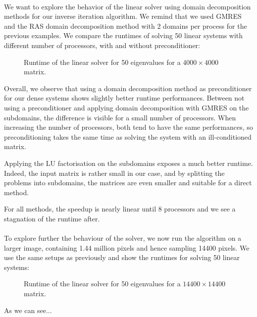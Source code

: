 \paragraph{}
We want to explore the behavior of the linear solver using domain decomposition methods for our inverse iteration algorithm.
We remind that we used GMRES and the RAS domain decomposition method with 2 domains per process for the previous examples.
We compare the runtimes of solving 50 linear systems with different number of processors, with and without preconditioner:

\begin{figure}[H]
 \centering
 
 \caption{Runtime of the linear solver for 50 eigenvalues for a \(4000 \times 4000\) matrix.}
\end{figure}

Overall, we observe that using a domain decomposition method as preconditioner for our dense systems shows slightly better runtime performances.
Between not using a preconditioner and applying domain decomposition with GMRES on the subdomains, the difference is visible for a small number of processors.
When increasing the number of processors, both tend to have the same performances, so preconditioning takes the same time as solving the system with an ill-conditioned matrix.

Applying the LU factorisation on the subdomains exposes a much better runtime.
Indeed, the input matrix is rather small in our case, and by splitting the problems into subdomains, the matrices are even smaller and suitable for a direct method.

For all methods, the speedup is nearly linear until 8 processors and we see a stagnation of the runtime after.

\paragraph{}
To explore further the behaviour of the solver, we now run the algorithm on a larger image, containing 1.44 million pixels and hence sampling 14400 pixels.
We use the same setups as previously and show the runtimes for solving 50 linear systems:

\begin{figure}[H]
 \centering
 
 \caption{Runtime of the linear solver for 50 eigenvalues for a \(14400 \times 14400\) matrix.}
\end{figure}

As we can see...
